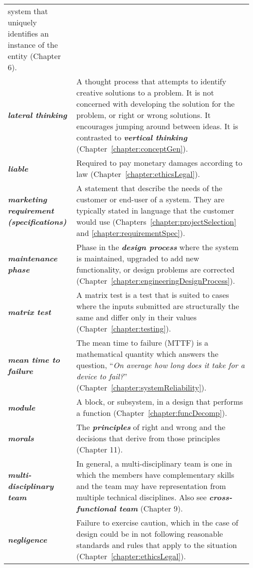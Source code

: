 \begin{longtable} { p{4cm} p{11cm}}
system that uniquely identifies an instance of the entity (Chapter
6). \\
\emph{\textbf{lateral thinking}} & A thought process that attempts to
identify creative solutions to a problem. It is not concerned with
developing the solution for the problem, or right or wrong solutions. It
encourages jumping around be­tween ideas. It is contrasted to
\emph{\textbf{vertical thinking}} (Chapter~\ref{chapter:conceptGen}). \\
\emph{\textbf{liable}} & Required to pay monetary damages according to
law (Chapter~\ref{chapter:ethicsLegal}). \\
\emph{\textbf{marketing requirement (specifications)}} & A statement
that describe the needs of the customer or end-user of a system. They
are typically stated in language that the customer would use (Chapters~\ref{chapter:projectSelection}
and \ref{chapter:requirementSpec}). \\
\emph{\textbf{maintenance phase}} & Phase in the \emph{\textbf{design
process}} where the system is maintained, upgraded to add new
functionality, or design problems are corrected (Chapter~\ref{chapter:engineeringDesignProcess}). \\
\emph{\textbf{matrix test}} & A matrix test is a test that is suited to
cases where the inputs submitted are structurally the same and differ
only in their values (Chapter~\ref{chapter:testing}). \\
\emph{\textbf{mean time to failure}} & The mean time to failure (MTTF)
is a mathematical quantity which answers the question, ``\emph{On
average how long does it take for a device to fail?}'' (Chapter~\ref{chapter:systemReliability}). \\
\emph{\textbf{module}} & A block, or subsystem, in a design that
performs a function (Chapter~\ref{chapter:funcDecomp}). \\
\emph{\textbf{morals}} & The \emph{\textbf{principles}} of right and
wrong and the decisions that derive from those principles (Chapter
11). \\
\emph{\textbf{multi-disciplinary team}} & In general, a
multi-disciplinary team is one in which the members have complementary
skills and the team may have representation from multiple technical
disciplines. Also see \emph{\textbf{cross-functional team}} (Chapter
9). \\
\emph{\textbf{negligence}} & Failure to exercise caution, which in the
case of design could be in not following reasonable standards and rules
that apply to the situation (Chapter~\ref{chapter:ethicsLegal}). \\

\end{longtable}

